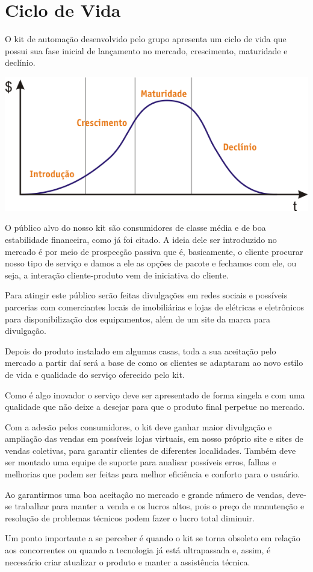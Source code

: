 \chapter{Ciclo de Vida}
\par O kit de automação desenvolvido pelo grupo apresenta um ciclo de vida que possui sua fase inicial de lançamento no mercado, crescimento, maturidade e declínio.

\begin{center}
\includegraphics[width=\textwidth]{figuras/ciclodevida}
\end{center}

\par O público alvo do nosso kit são consumidores de classe média e de boa estabilidade financeira, como já foi citado. A ideia dele ser introduzido no mercado é por meio de prospecção passiva que é, basicamente, o cliente procurar nosso tipo de serviço e damos a ele as opções de pacote e fechamos com ele, ou seja, a interação cliente-produto vem de iniciativa do cliente.
\par Para atingir este público serão feitas divulgações em redes sociais e possíveis parcerias com comerciantes locais de imobiliárias e lojas de elétricas e eletrônicos para disponibilização dos equipamentos, além de um site da marca para divulgação.
\par Depois do produto instalado em algumas casas, toda a sua aceitação pelo mercado a partir daí será a base de como os clientes se adaptaram ao novo estilo de vida e qualidade do serviço oferecido pelo kit.
\par Como é algo inovador o serviço deve ser apresentado de forma singela e com uma qualidade que não deixe a desejar para que o produto final perpetue no mercado.
\par Com a adesão pelos consumidores, o kit deve ganhar maior divulgação e ampliação das vendas em possíveis lojas virtuais, em nosso próprio site e sites de vendas coletivas, para garantir clientes de diferentes localidades. Também deve ser montado uma equipe de suporte para analisar possíveis erros, falhas e melhorias que podem ser feitas para melhor eficiência e conforto para o usuário.
\par Ao garantirmos uma boa aceitação no mercado e grande número de vendas, deve-se trabalhar para manter a venda e os lucros altos, pois o preço de manutenção e resolução de problemas técnicos podem fazer o lucro total diminuir.
\par Um ponto importante a se perceber é quando o kit se torna obsoleto em relação aos concorrentes ou quando a tecnologia já está ultrapassada e, assim, é necessário criar atualizar o produto e manter a assistência técnica.

